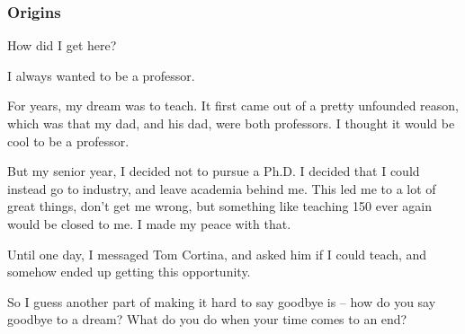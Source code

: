 \documentclass[aspectratio=169, handout]{beamer}
\begin{document}
\begin{frame}[fragile]
  \frametitle{Origins}

  How did I get here?

  \pause
  \vspace{\fill}

  I always wanted to be a professor.

  \pause
  \vspace{\fill}

  For years, my dream was to teach. It first came out of a pretty unfounded
  reason, which was that my dad, and his dad, were both professors. I thought
  it would be cool to be a professor.

  \pause
  \vspace{\fill}

  But my senior year, I decided not to pursue a Ph.D. I decided that I could
  instead go to industry, and leave academia behind me. This led me to a lot of
  great things, don't get me wrong, but something like teaching 150 ever again
  would be closed to me. I made my peace with that.

  \pause
  \vspace{\fill}

  Until one day, I messaged Tom Cortina, and asked him if I could teach, and
  somehow ended up getting this opportunity.

  \pause
  \vspace{\fill}

  So I guess another part of making it hard to say goodbye is -- how do you
  say goodbye to a dream? What do you do when your time comes to an end?
\end{frame}
\end{document}
